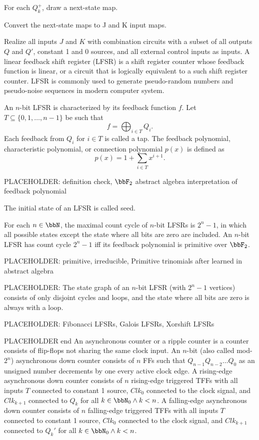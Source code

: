 \documentclass[a4paper,12pt]{report}
\begin{document}
\ben
\item For each $Q^+_k$, draw a next-state map.
\item Convert the next-state maps to J and K input maps.
\item Realize all inputs $J$ and $K$ with combination circuits with a subset of all outputs $Q$ and $Q'$, constant 1 and 0 sources, and all external control inputs as inputs.
\een
{}
A linear feedback shift register (LFSR) is a shift register counter whose feedback function is linear, or a circuit that is logically equivalent to a such shift register counter. LFSR is commonly used to generate pseudo-random numbers and pseudo-noise sequences in modern computer system.

An $n$-bit LFSR is characterized by its feedback function $f$. Let $T\subseteq\{0,1,\ldots,n-1\}$ be such that
\[f=\bigoplus_{i\in T}Q_i.\]
Each feedback from $Q_i$ for $i\in T$ is called a tap. The feedback polynomial, characteristic polynomial, or connection polynomial $p(x)$ is defined as
\[p(x)=1+\sum_{i\in T}x^{i+1}.\]

PLACEHOLDER: definition check, $\bbF_2$ abstract algebra interpretation of feedback polynomial

The initial state of an LFSR is called seed.

For each $n\in\bbN$, the maximal count cycle of $n$-bit LFSRs is $2^n-1$, in which all possible states except the state where all bits are zero are included. An $n$-bit LFSR has count cycle $2^n-1$ iff its feedback polynomial is primitive over $\bbF_2$.

PLACEHOLDER: primitive, irreducible, Primitive trinomials after learned in abstract algebra

PLACEHOLDER: The state graph of an $n$-bit LFSR (with $2^n-1$ vertices) consists of only disjoint cycles and loops, and the state where all bits are zero is always with a loop.

PLACEHOLDER: Fibonacci LFSRs, Galois LFSRs, Xorshift LFSRs

PLACEHOLDER end
An asynchronous counter or a ripple counter is a counter consists of flip-flops not sharing the same clock input.
An $n$-bit (also called mod-$2^n$) asynchronous down counter consists of $n$ FFs such that $Q_{n-1}Q_{n-2}\ldots Q_0$ as an unsigned number decrements by one every active clock edge. A rising-edge asynchronous down counter consists of $n$ rising-edge triggered TFFs with all inputs $T$ connected to constant 1 source, $Clk_0$ connected to the clock signal, and $Clk_{k+1}$ connected to $Q_k$ for all $k\in\bbN_0\land k<n$. A falling-edge asynchronous down counter consists of $n$ falling-edge triggered TFFs with all inputs $T$ connected to constant 1 source, $Clk_0$ connected to the clock signal, and $Clk_{k+1}$ connected to $Q_k'$ for all $k\in\bbN_0\land k<n$.
\end{document}
